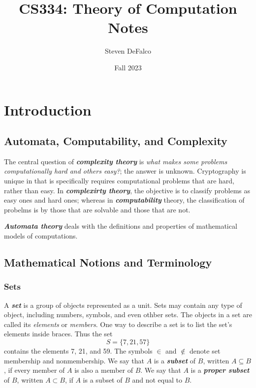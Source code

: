 \documentclass{article}
\title{CS334: Theory of Computation Notes}
\author{Steven DeFalco}
\date{Fall 2023}
\newcommand{\define}[1]{\textbf{\textit{#1}}}
\begin{document}
\maketitle
\tableofcontents
\newpage



\section{Introduction}

\subsection{Automata, Computability, and Complexity}

The central question of \define{complexity theory} is \emph{what makes some problems computationally hard and others easy?}; the answer is unknown. Cryptography is unique in that is specifically requires computational problems that are hard, rather than easy. 
In \define{complexirty theory}, the objective is to classify problems as easy ones and hard ones; whereas in \define{computability} theory, the classification of probelms is by those that are solvable and those that are not. 

\define{Automata theory} deals with the definitions and properties of mathematical models of computations. 

\subsection{Mathematical Notions and Terminology}

\subsubsection{Sets} 

A \define{set} is a group of objects represented as a unit. Sets may contain any type of object, including numbers, symbols, and even othber sets. The objects in a set are called its \emph{elements} or \emph{members}. One way to describe a set is to list the set's elements inside braces. Thus the set  $$S = \{7,21,57\}$$ contains the elements 7, 21, and 59. The symbols $\in$ and $\notin$ denote set membership and nonmembership. We say that $A$ is a \define{subset} of $B$, written $A \subseteq B$, if every member of $A$ is also a member of $B$. We say that $A$ is a \define{proper subset} of $B$, written $A \subset B$, if $A$ is a subset of $B$ and not equal to $B$. \\ 
\end{document}
